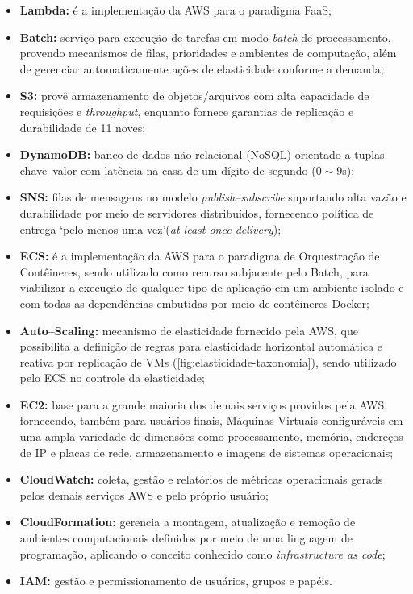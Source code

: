 \documentclass[english,brazilian]{UNISINOSmonografia} %
\begin{document}
\begin{itemize}
	
	\item \textbf{Lambda:} é a implementação da AWS para o paradigma FaaS;
	
	\item \textbf{Batch:} serviço para execução de tarefas em modo \textit{batch} de processamento, provendo mecanismos de filas, prioridades e ambientes de computação, além de gerenciar automaticamente ações de elasticidade conforme a demanda;
	
	\item \textbf{S3:} provê armazenamento de objetos/arquivos com alta capacidade de requisições e \textit{throughput}, enquanto fornece garantias de replicação e durabilidade de 11 noves;
	
	\item \textbf{DynamoDB:} banco de dados não relacional (NoSQL) orientado a tuplas chave--valor com latência na casa de um dígito de segundo ($0\sim9$s);
	
	\item \textbf{SNS:} filas de mensagens no modelo \textit{publish--subscribe} suportando alta vazão e durabilidade por meio de servidores distribuídos, fornecendo política de entrega \textquoteleft pelo menos uma vez\textquoteright (\textit{at least once delivery});
	
	\item \textbf{ECS:} é a implementação da AWS para o paradigma de Orquestração de Contêineres, sendo utilizado como recurso subjacente pelo Batch, para viabilizar a execução de qualquer tipo de aplicação em um ambiente isolado e com todas as dependências embutidas por meio de contêineres Docker;
	
	\item \textbf{Auto--Scaling:} mecanismo de elasticidade fornecido pela AWS, que possibilita a definição de regras para elasticidade horizontal automática e reativa por replicação de VMs (\autoref{fig:elasticidade-taxonomia}), sendo utilizado pelo ECS no controle da elasticidade;
	
	\item \textbf{EC2:} base para a grande maioria dos demais serviços providos pela AWS, fornecendo, também para usuários finais, Máquinas Virtuais configuráveis em uma ampla variedade de dimensões como processamento, memória, endereços de IP e placas de rede, armazenamento e imagens de sistemas operacionais;
	
	\item \textbf{CloudWatch:} coleta, gestão e relatórios de métricas operacionais gerads pelos demais serviços AWS e pelo próprio usuário;
	
	\item \textbf{CloudFormation:} gerencia a montagem, atualização e remoção de ambientes computacionais definidos por meio de uma linguagem de programação, aplicando o conceito conhecido como \textit{infrastructure as code};
	
	\item \textbf{IAM:} gestão e permissionamento de usuários, grupos e papéis.
	
\end{itemize}
\end{document}
